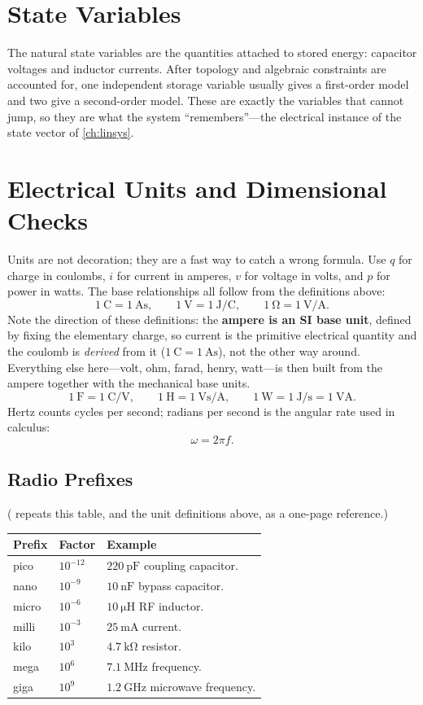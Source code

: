 \section{State Variables}
The natural state variables are the quantities attached to stored energy:
capacitor voltages and inductor currents. After topology and algebraic constraints
are accounted for, one independent storage variable usually gives a first-order
model and two give a second-order model. These are exactly the variables that cannot jump,
so they are what the system ``remembers''---the electrical instance of the state
vector of \cref{ch:linsys}.

\section{Electrical Units and Dimensional Checks}
Units are not decoration; they are a fast way to catch a wrong formula. Use
\(q\) for charge in coulombs, \(i\) for current in amperes, \(v\) for voltage in
volts, and \(p\) for power in watts. The base relationships all follow from the
definitions above:
\[
\SI{1}{\coulomb}=\SI{1}{\ampere\second},
\qquad
\SI{1}{\volt}=\SI{1}{\joule\per\coulomb},
\qquad
\SI{1}{\ohm}=\SI{1}{\volt\per\ampere}.
\]
Note the direction of these definitions: the \textbf{ampere is an SI base unit},
defined by fixing the elementary charge, so current is the primitive electrical
quantity and the coulomb is \emph{derived} from it (\(\SI{1}{\coulomb}
=\SI{1}{\ampere\second}\)), not the other way around. Everything else here---volt,
ohm, farad, henry, watt---is then built from the ampere together with the mechanical
base units.
\[
\SI{1}{\farad}=\SI{1}{\coulomb\per\volt},
\qquad
\SI{1}{\henry}=\SI{1}{\volt\second\per\ampere},
\qquad
\SI{1}{\watt}=\SI{1}{\joule\per\second}=\SI{1}{\volt\ampere}.
\]
Hertz counts cycles per second; radians per second is the angular rate used in
calculus:
\[
\omega=2\pi f.
\]

\subsection{Radio Prefixes}
( repeats this table, and the unit definitions above, as a one-page
reference.)
\begin{tabularx}{\textwidth}{@{}L{0.2\textwidth}L{0.2\textwidth}Y@{}}
\toprule
Prefix & Factor & Example \\
\midrule
pico & \(10^{-12}\) & \(\SI{220}{\pico\farad}\) coupling capacitor. \\
nano & \(10^{-9}\) & \(\SI{10}{\nano\farad}\) bypass capacitor. \\
micro & \(10^{-6}\) & \(\SI{10}{\micro\henry}\) RF inductor. \\
milli & \(10^{-3}\) & \(\SI{25}{\milli\ampere}\) current. \\
kilo & \(10^{3}\) & \(\SI{4.7}{\kilo\ohm}\) resistor. \\
mega & \(10^{6}\) & \(\SI{7.1}{\mega\hertz}\) frequency. \\
giga & \(10^{9}\) & \(\SI{1.2}{\giga\hertz}\) microwave frequency. \\
\bottomrule
\end{tabularx}


